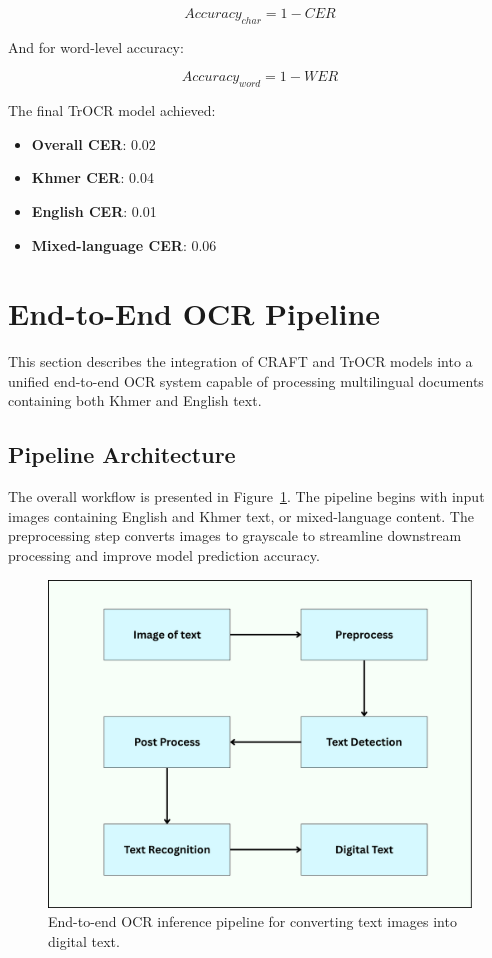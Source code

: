 \begin{equation}
    Accuracy_{char} = 1 - CER
\end{equation}

And for word-level accuracy:

\begin{equation}
    Accuracy_{word} = 1 - WER
\end{equation}

The final TrOCR model achieved:
\begin{itemize}
\item \textbf{Overall CER}: 0.02
\item \textbf{Khmer CER}: 0.04
\item \textbf{English CER}: 0.01
\item \textbf{Mixed-language CER}: 0.06
\end{itemize}

\section{End-to-End OCR Pipeline}
\label{sec:end-to-end-pipeline}

This section describes the integration of CRAFT and TrOCR models into a unified end-to-end OCR system capable of processing multilingual documents containing both Khmer and English text.

\subsection{Pipeline Architecture}
\label{subsec:pipeline-architecture}

The overall workflow is presented in Figure~\ref{fig:trocr-inference-full-pipeline}. The pipeline begins with input images containing English and Khmer text, or mixed-language content. The preprocessing step converts images to grayscale to streamline downstream processing and improve model prediction accuracy.

\begin{figure}[H]
    \centering
    \includegraphics[width=\textwidth]{figures/khmerOCR_inference_full_pipeline.png}
    \caption{End-to-end OCR inference pipeline for converting text images into digital text.}
    \label{fig:trocr-inference-full-pipeline}
\end{figure}

